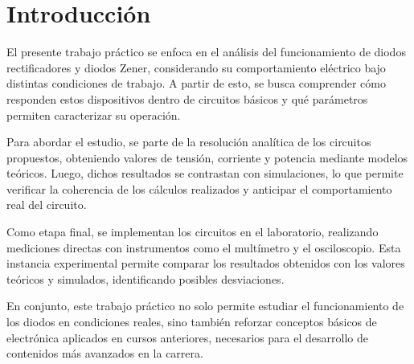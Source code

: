 \chapter{Introducción}
El presente trabajo práctico se enfoca en el análisis del funcionamiento de diodos rectificadores y diodos Zener, considerando su comportamiento eléctrico bajo distintas condiciones de trabajo. A partir de esto, se busca comprender cómo responden estos dispositivos dentro de circuitos básicos y qué parámetros permiten caracterizar su operación.

Para abordar el estudio, se parte de la resolución analítica de los circuitos propuestos, obteniendo valores de tensión, corriente y potencia mediante modelos teóricos. Luego, dichos resultados se contrastan con simulaciones, lo que permite verificar la coherencia de los cálculos realizados y anticipar el comportamiento real del circuito.

Como etapa final, se implementan los circuitos en el laboratorio, realizando mediciones directas con instrumentos como el multímetro y el osciloscopio. Esta instancia experimental permite comparar los resultados obtenidos con los valores teóricos y simulados, identificando posibles desviaciones.

En conjunto, este trabajo práctico no solo permite estudiar el funcionamiento de los diodos en condiciones reales, sino también reforzar conceptos básicos de electrónica aplicados en cursos anteriores, necesarios para el desarrollo de contenidos más avanzados en la carrera.
